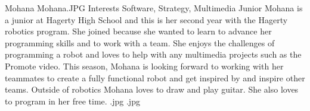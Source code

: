 \insertbio
{Mohana}
{Mohana.JPG}
{Interests}
{Software, Strategy, Multimedia}
{Junior}
{  
Mohana is a junior at Hagerty High School and this is her second year with the Hagerty robotics program. She joined because she wanted to learn to advance her programming skills and to work with a team. She enjoys the challenges of programming a robot and loves to help with any multimedia projects such as the Promote video. This season, Mohana is looking forward to working with her teammates to create a fully functional robot and get inspired by and inspire other teams. Outside of robotics Mohana loves to draw and play guitar. She also loves to program in her free time.  
}
{.jpg}
{.jpg}
